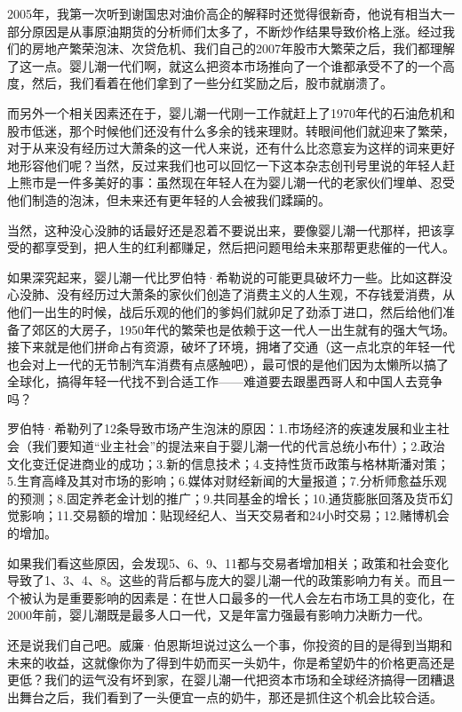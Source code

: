 2005年，我第一次听到谢国忠对油价高企的解释时还觉得很新奇，他说有相当大一部分原因是从事原油期货的分析师们太多了，不断炒作结果导致价格上涨。经过我们的房地产繁荣泡沫、次贷危机、我们自己的2007年股市大繁荣之后，我们都理解了这一点。婴儿潮一代们啊，就这么把资本市场推向了一个谁都承受不了的一个高度，然后，我们看着在他们拿到了一些分红奖励之后，股市就崩溃了。

而另外一个相关因素还在于，婴儿潮一代刚一工作就赶上了1970年代的石油危机和股市低迷，那个时候他们还没有什么多余的钱来理财。转眼间他们就迎来了繁荣，对于从来没有经历过大萧条的这一代人来说，还有什么比恣意妄为这样的词来更好地形容他们呢？当然，反过来我们也可以回忆一下这本杂志创刊号里说的年轻人赶上熊市是一件多美好的事：虽然现在年轻人在为婴儿潮一代的老家伙们埋单、忍受他们制造的泡沫，但未来还有更年轻的人会被我们蹂躏的。

当然，这种没心没肺的话最好还是忍着不要说出来，要像婴儿潮一代那样，把该享受的都享受到，把人生的红利都赚足，然后把问题甩给未来那帮更悲催的一代人。

如果深究起来，婴儿潮一代比罗伯特·希勒说的可能更具破坏力一些。比如这群没心没肺、没有经历过大萧条的家伙们创造了消费主义的人生观，不存钱爱消费，从他们一出生的时候，战后乐观的他们的爹妈们就卯足了劲添丁进口，然后给他们准备了郊区的大房子，1950年代的繁荣也是依赖于这一代人一出生就有的强大气场。接下来就是他们拼命占有资源，破坏了环境，拥堵了交通（这一点北京的年轻一代也会对上一代的无节制汽车消费有点感触吧），最可恨的是他们因为太懒所以搞了全球化，搞得年轻一代找不到合适工作------难道要去跟墨西哥人和中国人去竞争吗？

罗伯特·希勒列了12条导致市场产生泡沫的原因：1.市场经济的疾速发展和业主社会（我们要知道``业主社会''的提法来自于婴儿潮一代的代言总统小布什）；2.政治文化变迁促进商业的成功；3.新的信息技术；4.支持性货币政策与格林斯潘对策；5.生育高峰及其对市场的影响；6.媒体对财经新闻的大量报道；7.分析师愈益乐观的预测；8.固定养老金计划的推广；9.共同基金的增长；10.通货膨胀回落及货币幻觉影响；11.交易额的增加：贴现经纪人、当天交易者和24小时交易；12.赌博机会的增加。

如果我们看这些原因，会发现5、6、9、11都与交易者增加相关；政策和社会变化导致了1、3、4、8。这些的背后都与庞大的婴儿潮一代的政策影响力有关。而且一个被认为是重要影响的因素是：在世人口最多的一代人会左右市场工具的变化，在2000年前，婴儿潮既是最多人口一代，又是年富力强最有影响力决断力一代。

还是说我们自己吧。威廉·伯恩斯坦说过这么一个事，你投资的目的是得到当期和未来的收益，这就像你为了得到牛奶而买一头奶牛，你是希望奶牛的价格更高还是更低？我们的运气没有坏到家，在婴儿潮一代把资本市场和全球经济搞得一团糟退出舞台之后，我们看到了一头便宜一点的奶牛，那还是抓住这个机会比较合适。

